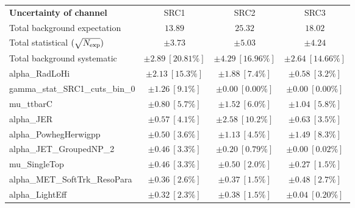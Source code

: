
\begin{table}
\begin{center}
\setlength{\tabcolsep}{0.0pc}
\begin{tabular*}{\textwidth}{@{\extracolsep{\fill}}lccc}
\noalign{\smallskip}\hline\noalign{\smallskip}
{\bf Uncertainty of channel}                                    & SRC1            & SRC2            & SRC3            \\
\noalign{\smallskip}\hline\noalign{\smallskip}
Total background expectation             &  $13.89$        &  $25.32$        &  $18.02$       \\
\noalign{\smallskip}\hline\noalign{\smallskip}
Total statistical $(\sqrt{N_{\rm exp}})$              & $\pm 3.73$        & $\pm 5.03$        & $\pm 4.24$       \\
Total background systematic               & $\pm 2.89\ [20.81\%] $        & $\pm 4.29\ [16.96\%] $        & $\pm 2.64\ [14.66\%] $             \\
\noalign{\smallskip}\hline\noalign{\smallskip}
\noalign{\smallskip}\hline\noalign{\smallskip}
alpha\_RadLoHi         & $\pm 2.13\ [15.3\%] $          & $\pm 1.88\ [7.4\%] $          & $\pm 0.58\ [3.2\%] $       \\
gamma\_stat\_SRC1\_cuts\_bin\_0         & $\pm 1.26\ [9.1\%] $          & $\pm 0.00\ [0.00\%] $          & $\pm 0.00\ [0.00\%] $       \\
mu\_ttbarC         & $\pm 0.80\ [5.7\%] $          & $\pm 1.52\ [6.0\%] $          & $\pm 1.04\ [5.8\%] $       \\
alpha\_JER         & $\pm 0.57\ [4.1\%] $          & $\pm 2.58\ [10.2\%] $          & $\pm 0.63\ [3.5\%] $       \\
alpha\_PowhegHerwigpp         & $\pm 0.50\ [3.6\%] $          & $\pm 1.13\ [4.5\%] $          & $\pm 1.49\ [8.3\%] $       \\
alpha\_JET\_GroupedNP\_2         & $\pm 0.46\ [3.3\%] $          & $\pm 0.20\ [0.79\%] $          & $\pm 0.00\ [0.02\%] $       \\
mu\_SingleTop         & $\pm 0.46\ [3.3\%] $          & $\pm 0.50\ [2.0\%] $          & $\pm 0.27\ [1.5\%] $       \\
alpha\_MET\_SoftTrk\_ResoPara         & $\pm 0.36\ [2.6\%] $          & $\pm 0.37\ [1.5\%] $          & $\pm 0.48\ [2.7\%] $       \\
alpha\_LightEff         & $\pm 0.32\ [2.3\%] $          & $\pm 0.38\ [1.5\%] $          & $\pm 0.04\ [0.20\%] $       \\

\end{tabular*}
\end{center}
\end{table}
